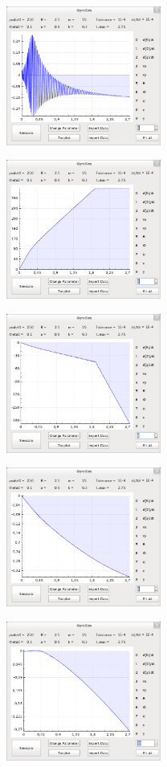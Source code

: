 \includegraphics[width=2in,keepaspectratio=true]{figures/mainwindow_g5.png}

\includegraphics[width=2in,keepaspectratio=true]{figures/mainwindow_g7.png}

\includegraphics[width=2in,keepaspectratio=true]{figures/mainwindow_g8.png}

\includegraphics[width=2in,keepaspectratio=true]{figures/mainwindow_g9.png}

\includegraphics[width=2in,keepaspectratio=true]{figures/mainwindow_g10.png}
\newpage


